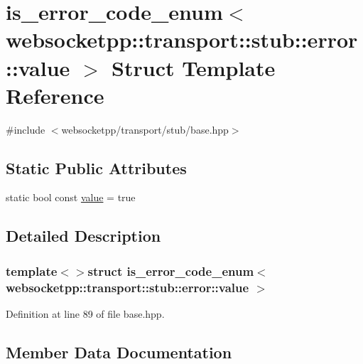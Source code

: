 \hypertarget{structis__error__code__enum_3_01websocketpp_1_1transport_1_1stub_1_1error_1_1value_01_4}{}\section{is\+\_\+error\+\_\+code\+\_\+enum$<$ websocketpp\+:\+:transport\+:\+:stub\+:\+:error\+:\+:value $>$ Struct Template Reference}
\label{structis__error__code__enum_3_01websocketpp_1_1transport_1_1stub_1_1error_1_1value_01_4}


{\ttfamily \#include $<$websocketpp/transport/stub/base.\+hpp$>$}

\subsection*{Static Public Attributes}
\begin{DoxyCompactItemize}
\item 
static bool const \hyperlink{structis__error__code__enum_3_01websocketpp_1_1transport_1_1stub_1_1error_1_1value_01_4_a48ac59af9c03585ba1f1f7b8e83a45ee}{value} = true
\end{DoxyCompactItemize}


\subsection{Detailed Description}
\subsubsection*{template$<$$>$struct is\+\_\+error\+\_\+code\+\_\+enum$<$ websocketpp\+::transport\+::stub\+::error\+::value $>$}



Definition at line 89 of file base.\+hpp.



\subsection{Member Data Documentation}
\hypertarget{structis__error__code__enum_3_01websocketpp_1_1transport_1_1stub_1_1error_1_1value_01_4_a48ac59af9c03585ba1f1f7b8e83a45ee}{}
